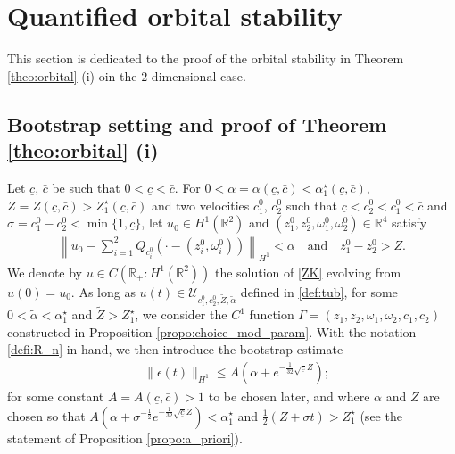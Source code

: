 \documentclass[reqno,10pt]{amsart}
\numberwithin{equation}{section}
\begin{document}
 
	
\section{Quantified orbital stability} \label{Sec:orbital}
This section is dedicated to the proof of the orbital stability in Theorem \ref{theo:orbital} (i) oin the $2$-dimensional case. 

 \subsection{Bootstrap setting and proof of Theorem \ref{theo:orbital} (i)}
Let  $\underline{c}$, $\bar{c}$ be such that $0< \underline{c}< \bar{c}$. 
For $0<\alpha=\alpha(\underline{c},\bar{c})<\alpha_1^ {\star}(\underline{c},\bar{c})$, $Z=Z(\underline{c},\bar{c})>Z_1^ {\star}(\underline{c},\bar{c})$ and two velocities $c_1^ 0$, $c_2^0$ such that $\underline{c} < c_2^0 <c_1^0 < \bar{c}$ and $\sigma=c_1^0-c_2^0<\min\{1,\underline{c}\}$, let $u_0\in H^1(\mathbb{R}^2)$ and $(z_1^0,z_2^0,\omega_1^0,\omega_2^0) \in \mathbb R^4$ satisfy
		\begin{align} \label{est:u0}
			\left\| u_0 - \sum_{i=1}^2 Q_{c_i^0}\left( \cdot - (z_i^0, \omega_i^0) \right) \right\|_{H^1} < \alpha \quad \text{and} \quad z_1^0-z_2^0>Z.
		\end{align}
 We denote by $u \in C(\mathbb R_+ : H^ 1(\mathbb R^2 ))$ the solution of \eqref{ZK} evolving from $u(0)=u_0$. As long as $u(t) \in \mathcal{U}_{c_1^0,c_2^0,\tilde{Z},\tilde{\alpha}}$ defined in \eqref{def:tub}, for some $0<\tilde{\alpha}<\alpha_1^{\star}$ and $\tilde{Z}>Z_1^{\star}$, we consider the $C^1$ function $\Gamma=(z_1,z_2,\omega_1,\omega_2,c_1,c_2)$ constructed in Proposition \ref{propo:choice_mod_param}. With the notation \eqref{defi:R_n} in hand, we then introduce the bootstrap estimate 
\begin{align} 
&\|\epsilon(t)\|_{H^1} \leq A \left( \alpha + e^{-\frac{1}{32} \sqrt{\underline{c}}Z }  \right) ; \label{BS:eps} %
\end{align}
for some constant $A=A(\underline{c},\bar{c})>1$ to be chosen later, and where $\alpha$ and $Z$ are chosen so that $A \left( \alpha + \sigma^{-\frac12}e^{-\frac{1}{32} \sqrt{\underline{c}}Z }  \right)< \alpha_1^{\star}$ and $\frac12 (Z+\sigma t)>Z_1^{\star}$ (see the statement of Proposition \ref{propo:a_priori}).  
\end{document}
